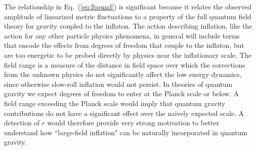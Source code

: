 The relationship in Eq.~(\ref{eq:lbound}) is significant because it relates the observed amplitude of linearized metric fluctuations to a property of the full quantum field theory for gravity coupled to the inflaton. The action describing inflation, like the action for any other particle physics phenomena, in general will include terms that encode the effects from degrees of freedom that couple to the inflaton, but are too energetic to be probed directly by physics near the inflationary scale. The field range is a measure of the distance in field space over which the corrections from the unknown physics do not significantly affect the low energy dynamics, since otherwise slow-roll inflation would not persist. In theories of quantum gravity we expect degrees of freedom to enter at the Planck scale or below. A field range exceeding the Planck scale would imply that quantum gravity contributions do not have a significant effect over the naively expected scale. 
A detection of $r$ would therefore provide very strong motivation to better understand how ``large-field inflation" can be naturally incorporated in quantum gravity. %

